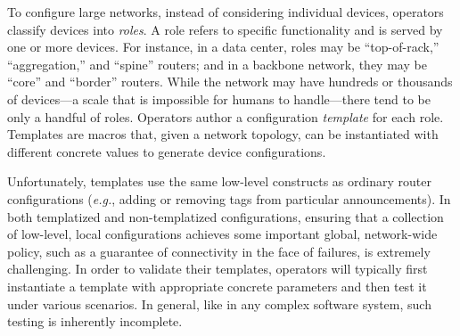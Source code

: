 \documentclass[numbers, 10pt, preprint]{sigplanconf}
\newcommand{\EG}{\emph{e.g.}}
\begin{document}
To configure large networks, instead of considering individual
devices, operators classify devices into {\em roles}. A role refers to
specific functionality and is served by one or more devices. For instance, in a
data center, roles may be ``top-of-rack,'' ``aggregation,'' and ``spine''
routers; and in a backbone network, they may be ``core'' and ``border''
routers. While the network may have hundreds or thousands of devices---a scale
that is impossible for humans to handle---there tend to be only a handful of roles.
%
Operators author a configuration {\em template} for each role. Templates are
macros that, given a network topology, can be instantiated with different concrete values to generate device configurations.

Unfortunately, templates use the same low-level constructs as ordinary router configurations (\EG,
adding or removing tags from particular announcements).  In both templatized
and non-templatized configurations, ensuring that a collection of low-level, local configurations
achieves some important global, network-wide policy, such as a guarantee of connectivity in the face of 
failures, is extremely challenging.
%
%
In order to validate  their templates, operators will typically first instantiate a template with appropriate
concrete parameters
and then test it under various scenarios.  In general, like in any complex software system, such testing is inherently incomplete.
\end{document}
